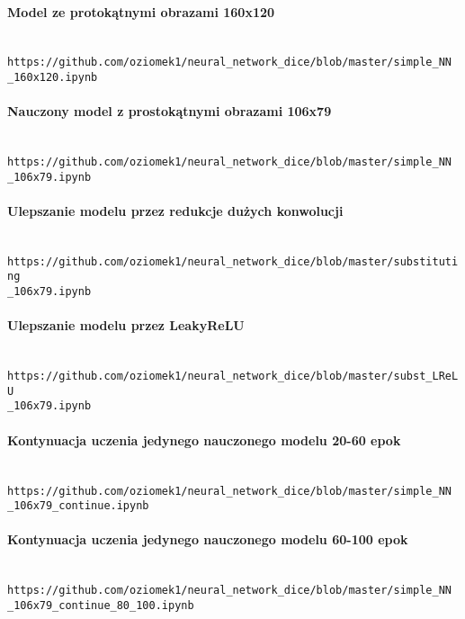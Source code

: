 \paragraph{Model ze protokątnymi obrazami 160x120} \mbox{}\\
\texttt{https://github.com/oziomek1/neural\_network\_dice/blob/master/simple\_NN\\\_160x120.ipynb}

\paragraph{Nauczony model z prostokątnymi obrazami 106x79} \mbox{}\\
\texttt{https://github.com/oziomek1/neural\_network\_dice/blob/master/simple\_NN\\\_106x79.ipynb}

\paragraph{Ulepszanie modelu przez redukcje dużych konwolucji} \mbox{}\\
\texttt{https://github.com/oziomek1/neural\_network\_dice/blob/master/substituting\\\_106x79.ipynb}

\paragraph{Ulepszanie modelu przez LeakyReLU} \mbox{}\\
\texttt{https://github.com/oziomek1/neural\_network\_dice/blob/master/subst\_LReLU\\\_106x79.ipynb}

\paragraph{Kontynuacja uczenia jedynego nauczonego modelu 20-60 epok} \mbox{}\\
\texttt{https://github.com/oziomek1/neural\_network\_dice/blob/master/simple\_NN\\\_106x79\_continue.ipynb}

\paragraph{Kontynuacja uczenia jedynego nauczonego modelu 60-100 epok} \mbox{}\\
\texttt{https://github.com/oziomek1/neural\_network\_dice/blob/master/simple\_NN\\\_106x79\_continue\_80\_100.ipynb}

